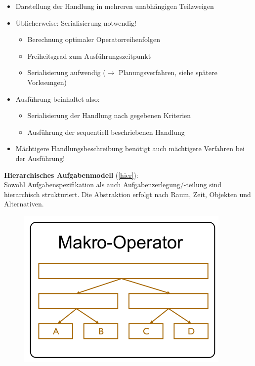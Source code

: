 \begin{itemize}
\item Darstellung der Handlung in mehreren unabhängigen Teilzweigen
\item Üblicherweise: Serialisierung notwendig!
\begin{itemize}
\item Berechnung optimaler Operatorreihenfolgen
\item Freiheitsgrad zum Ausführungszeitpunkt
\item Serialisierung aufwendig ($\rightarrow$ Planungsverfahren, siehe spätere Vorlesungen)
\end{itemize}
\item Ausführung beinhaltet also:
\begin{itemize}
\item Serialisierung der Handlung nach gegebenen Kriterien
\item Ausführung der sequentiell beschriebenen Handlung
\end{itemize}
\item Mächtigere Handlungsbeschreibung benötigt auch mächtigere Verfahren bei der Ausführung!
\end{itemize}
\textbf{Hierarchisches Aufgabenmodell} (\autoref{hier}):\\
Sowohl Aufgabenspezifikation als auch Aufgabenzerlegung/-teilung sind hierarchisch strukturiert. Die Abstraktion erfolgt nach Raum, Zeit, Objekten und Alternativen.
\begin{figure}[h!]\centering 
\includegraphics[width=0.3\linewidth]{figures/ch02_hier.png}
\caption{}
\label{hier}
\end{figure}\\
